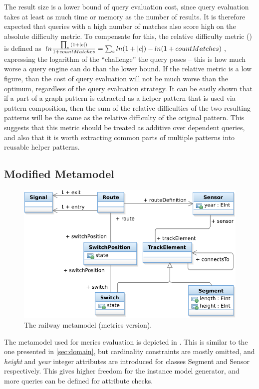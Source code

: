 The result size is a lower bound of query evaluation cost, since query
evaluation takes at least as much time or memory as the number of results. It is
therefore expected that queries with a high number of matches also score high on
the absolute difficulty metric. To compensate for this, the relative difficulty
metric () is defined as
$ln\frac{\prod_{c}{(1+|{c}|)}}{1+countMatches} = \sum_{c}{ln(1+|{c}|)} -
ln(1+countMatches)$, expressing the logarithm of the ``challenge'' the query
poses -- this is how much worse a query engine can do than the lower bound. 
If the relative metric is a low figure, than the cost of query evaluation will not
be much worse than the optimum, regardless of the query evaluation strategy. It
can be easily shown that if a part of a graph pattern is extracted as a helper
pattern that is used via pattern composition, then the sum of the relative
difficulties of the two resulting patterns will be the same as the relative
difficulty of the original pattern. This suggests that this metric should be
treated as additive over dependent queries, and also that it is worth extracting
common parts of multiple patterns into reusable helper patterns.

\subsection{Modified Metamodel}

\begin{figure}[htb]
\begin{center}
\includegraphics[width=12cm]{figures/TrainMMMet.pdf}
\caption{The railway metamodel (metrics version).}
\label{fig:metamodel-met}
\end{center}
\end{figure}

The metamodel used for merics evaluation is depicted in . This is similar to the one presented in \autoref{sec:domain}, but cardinality constraints are mostly omitted, and \emph{height} and \emph{year} integer attributes are introduced for classes Segment and Sensor respectively. This gives higher freedom for the instance model generator, and more queries can be defined for attribute checks.

